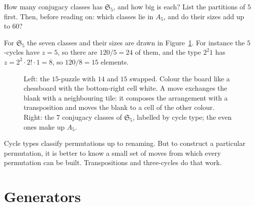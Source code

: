 \begin{think}
How many conjugacy classes has $\mathfrak S_5$, and how big is each? List the partitions of $5$ first. Then, before reading on: which classes lie in $A_5$, and do their sizes add up to $60$?
\end{think}

For $\mathfrak S_5$ the seven classes and their sizes are drawn in Figure~\ref{fig:fifteen}. For instance the $5$-cycles have $z=5$, so there are $120/5=24$ of them, and the type $2^2 1$ has $z=2^2\cdot2!\cdot1=8$, so $120/8=15$ elements.

\begin{figure}[ht]
\centering
{}
\caption{Left: the $15$-puzzle with $14$ and $15$ swapped. Colour the board like a chessboard with the bottom-right cell white. A move exchanges the blank with a neighbouring tile: it composes the arrangement with a transposition and moves the blank to a cell of the other colour. Right: the $7$ conjugacy classes of $\mathfrak S_5$, labelled by cycle type; the even ones make up $A_5$.}
\label{fig:fifteen}
\end{figure}

Cycle types classify permutations up to renaming. But to construct a particular permutation, it is better to know a small set of moves from which every permutation can be built. Transpositions and three-cycles do that work.

\section{Generators}

